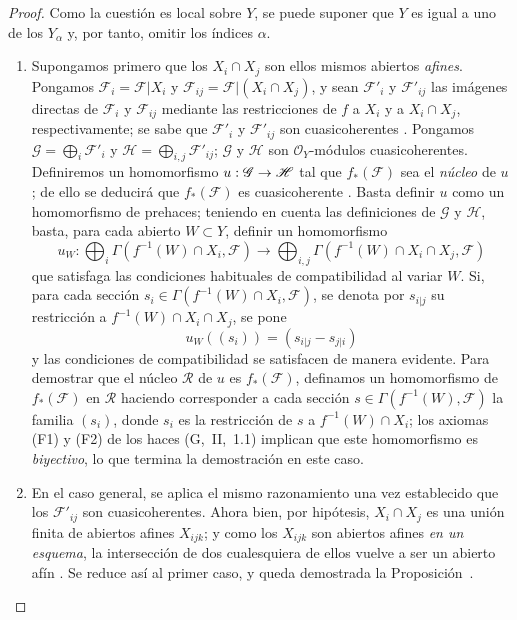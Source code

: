 \documentclass[oneside]{amsart}
\theoremstyle{ega-env-style}
\theoremstyle{ega-thm-env-style}
\theoremstyle{ega-defn-env-style}
\renewcommand{\to}{\mathchoice{\longrightarrow}{\rightarrow}{\rightarrow}{\rightarrow}}
\newcommand{\oldpage}[2][]{{\marginnote{\normalfont{\textbf{#1}~|~#2}}}\ignorespaces}
\begin{document}
\begin{proof}
Como la cuestión es local sobre $Y$, se puede suponer que $Y$ es igual a
uno de los $Y_\alpha$ y, por tanto, omitir los índices $\alpha$.
\begin{enumerate}
  \item[\emph{a)}] Supongamos primero que los $X_i\cap X_j$ son ellos mismos
    abiertos \emph{afines}. Pongamos $\mathscr{F}_i=\mathscr{F}|X_i$ y
    $\mathscr{F}_{ij}=\mathscr{F}|(X_i\cap X_j)$, y sean $\mathscr{F}'_i$ y
    $\mathscr{F}'_{ij}$ las imágenes directas de $\mathscr{F}_i$ y
    $\mathscr{F}_{ij}$ mediante las restricciones de $f$ a $X_i$ y a
    $X_i\cap X_j$, respectivamente; se sabe que $\mathscr{F}'_i$ y
    $\mathscr{F}'_{ij}$ son cuasicoherentes . Pongamos
    $\mathscr{G}=\bigoplus_i\mathscr{F}'_i$ y
    $\mathscr{H}=\bigoplus_{i,j}\mathscr{F}'_{ij}$; $\mathscr{G}$ y $\mathscr{H}$ son
    $\mathscr{O}_Y$-módulos cuasicoherentes. Definiremos un homomorfismo
    $u:\mathscr{G}\to\mathscr{H}$ tal que $f_*(\mathscr{F})$ sea el \emph{núcleo} de
    $u$; de ello se deducirá que $f_*(\mathscr{F})$ es cuasicoherente
    . Basta definir $u$
\oldpage[I]{172}
    como un homomorfismo de prehaces; teniendo en cuenta las definiciones
    de $\mathscr{G}$ y $\mathscr{H}$, basta, para cada abierto $W\subset Y$, definir
    un homomorfismo
    \[
  u_W:\bigoplus_i\Gamma(f^{-1}(W)\cap X_i,\mathscr{F})
  \longrightarrow
  \bigoplus_{i,j}\Gamma(f^{-1}(W)\cap X_i\cap X_j,\mathscr{F})
\]
    que satisfaga las condiciones habituales de compatibilidad al variar
    $W$. Si, para cada sección
    $s_i\in\Gamma(f^{-1}(W)\cap X_i,\mathscr{F})$, se denota por $s_{i|j}$ su
    restricción a $f^{-1}(W)\cap X_i\cap X_j$, se pone
    \[
  u_W((s_i))=(s_{i|j}-s_{j|i})
\]
    y las condiciones de compatibilidad se satisfacen de manera evidente.
    Para demostrar que el núcleo $\mathscr{R}$ de $u$ es $f_*(\mathscr{F})$,
    definamos un homomorfismo de $f_*(\mathscr{F})$ en $\mathscr{R}$ haciendo
    corresponder a cada sección
    $s\in\Gamma(f^{-1}(W),\mathscr{F})$ la familia $(s_i)$, donde $s_i$ es la
    restricción de $s$ a $f^{-1}(W)\cap X_i$; los axiomas (F1) y (F2) de
    los haces (G,~II,~1.1) implican que este homomorfismo es
    \emph{biyectivo}, lo que termina la demostración en este caso.
  \item[\emph{b)}] En el caso general, se aplica el mismo razonamiento una vez
    establecido que los $\mathscr{F}'_{ij}$ son cuasicoherentes. Ahora bien,
    por hipótesis, $X_i\cap X_j$ es una unión finita de abiertos afines
    $X_{ijk}$; y como los $X_{ijk}$ son abiertos afines \emph{en un
    esquema}, la intersección de dos cualesquiera de ellos vuelve a ser un
    abierto afín . Se reduce así al primer caso, y
    queda demostrada la Proposición~.
\end{enumerate}
\end{proof}
\end{document}
